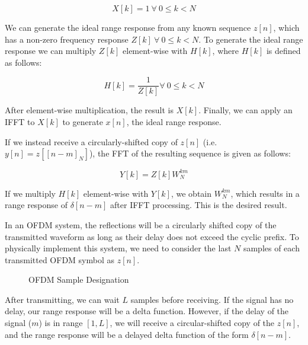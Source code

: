\documentclass[conference]{IEEEtran}
\begin{document}
		\begin{equation}
			X[k] = 1\ \forall\ 0 \leq k < N 
		\end{equation}
		
		We can generate the ideal range response from any known sequence $z[n]$, which has a non-zero frequency response $Z[k]\ \forall\ 0 \leq k < N$. To generate the ideal range response we can multiply $Z[k]$ element-wise with $H[k]$, where $H[k]$ is defined as follows:
		
		\begin{equation}
			H[k] = \frac{1}{Z[k]} \forall\ 0 \leq k < N
		\end{equation}
		
		After element-wise multiplication, the result is $X[k]$. Finally, we can apply an IFFT to $X[k]$ to generate $x[n]$, the ideal range response.
		
		If we instead receive a circularly-shifted copy of $z[n]$ (i.e. $y[n] = z[[n-m]_N]$), the FFT of the resulting sequence is given as follows:
		
		\begin{equation}
			Y[k] = Z[k]W_N^{km}
		\end{equation}
		
		If we multiply $H[k]$ element-wise with $Y[k]$, we obtain $W_N^{km}$, which results in a range response of $\delta[n-m]$ after IFFT processing. This is the desired result.
		
		In an OFDM system, the reflections will be a circularly shifted copy of the transmitted waveform as long as their delay does not exceed the cyclic prefix. To physically implement this system, we need to consider the last $N$ samples of each transmitted OFDM symbol as $z[n]$.
		
		\begin{figure}[H]
			\centering
    			\caption{OFDM Sample Designation}
    			\label{fig::ofdm_radar_waveform}
  	  	\end{figure}
		
		After transmitting, we can wait $L$ samples before receiving. If the signal has no delay, our range response will be a delta function. However, if the delay of the signal ($m$) is in range $[1, L]$, we will receive a circular-shifted copy of the $z[n]$, and the range response will be a delayed delta function of the form $\delta[n-m]$. 
		
\end{document}

